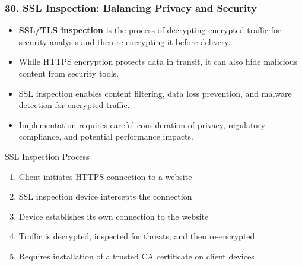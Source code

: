 \documentclass{beamer}
\begin{document}
		\begin{frame}
			\frametitle{30. SSL Inspection: Balancing Privacy and Security}
			\begin{itemize}
				\item \textbf{SSL/TLS inspection} is the process of decrypting encrypted traffic for security analysis and then re-encrypting it before delivery.
				\item While HTTPS encryption protects data in transit, it can also hide malicious content from security tools.
				\item SSL inspection enables content filtering, data loss prevention, and malware detection for encrypted traffic.
				\item Implementation requires careful consideration of privacy, regulatory compliance, and potential performance impacts.
			\end{itemize}
			
			\begin{example}{SSL Inspection Process}
				\scriptsize
				\begin{enumerate}
					\item Client initiates HTTPS connection to a website
					\item SSL inspection device intercepts the connection
					\item Device establishes its own connection to the website
					\item Traffic is decrypted, inspected for threats, and then re-encrypted
					\item Requires installation of a trusted CA certificate on client devices
				\end{enumerate}
			\end{example}
		\end{frame}
		
\end{document}
